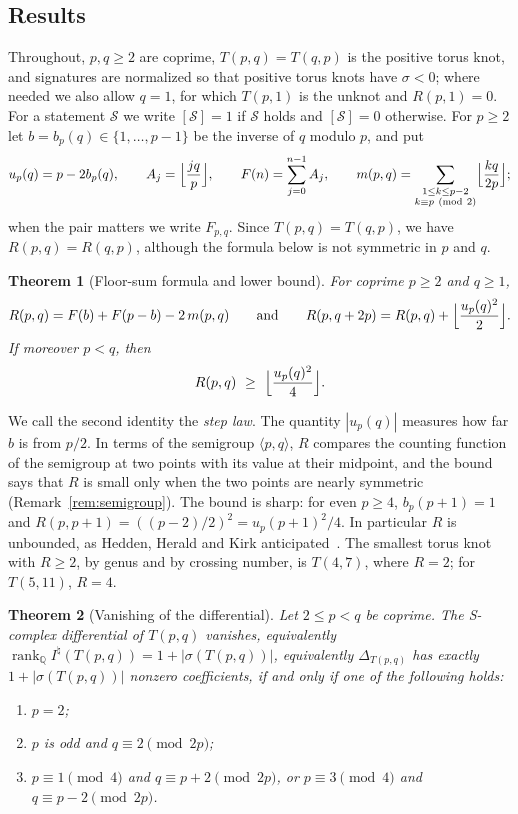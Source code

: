 \documentclass[11pt,reqno]{amsart}
\theoremstyle{plain}
\newtheorem{theorem}{Theorem}[section]
\theoremstyle{definition}
\newcommand{\Q}{\mathbb{Q}}
\newcommand{\Inat}{I^{\natural}}
\begin{document}
\subsection{Results}
Throughout, $p,q\ge2$ are coprime, $T(p,q)=T(q,p)$ is the positive torus knot, and signatures are
normalized so that positive torus knots have $\sigma<0$; where needed we also allow $q=1$, for which
$T(p,1)$ is the unknot and $R(p,1)=0$. For a statement $\mathcal S$ we write $[\mathcal S]=1$ if $\mathcal S$ holds and $[\mathcal S]=0$
otherwise. For $p\ge2$ let $b=b_p(q)\in\{1,\dots,p-1\}$ be the inverse of $q$ modulo $p$, and put
\[
u_p(q)=p-2b_p(q),\qquad A_j=\Bigl\lfloor\frac{jq}{p}\Bigr\rfloor,\qquad F(n)=\sum_{j=0}^{n-1}A_j,
\qquad m(p,q)=\sum_{\substack{1\le k\le p-2\\ k\equiv p\ (\mathrm{mod}\ 2)}}\Bigl\lfloor\frac{kq}{2p}\Bigr\rfloor ;
\]
when the pair matters we write $F_{p,q}$. Since $T(p,q)=T(q,p)$, we have $R(p,q)=R(q,p)$, although the formula below is not symmetric in $p$
and $q$.

\begin{theorem}[Floor-sum formula and lower bound]\label{thm:main}
For coprime $p\ge2$ and $q\ge1$,
\[
R(p,q)=F(b)+F(p-b)-2\,m(p,q)\qquad\text{and}\qquad
R(p,q+2p)=R(p,q)+\Bigl\lfloor\frac{u_p(q)^2}{2}\Bigr\rfloor.
\]
If moreover $p<q$, then
\[
R(p,q)\ \ge\ \Bigl\lfloor\frac{u_p(q)^2}{4}\Bigr\rfloor.
\]
\end{theorem}

We call the second identity the \emph{step law}. The quantity $|u_p(q)|$ measures how far $b$ is from
$p/2$. In terms of the semigroup $\langle p,q\rangle$, $R$ compares the counting function of the
semigroup at two points with its value at their midpoint, and the bound says that $R$ is small only
when the two points are nearly symmetric (Remark~\ref{rem:semigroup}). The bound is sharp: for even $p\ge4$, $b_p(p+1)=1$
and $R(p,p+1)=((p-2)/2)^2=u_p(p+1)^2/4$. In particular $R$ is unbounded, as Hedden, Herald and Kirk
anticipated~\cite[\S12.6]{HHK1}. The smallest torus knot with $R\ge2$, by genus and by crossing number,
is $T(4,7)$, where $R=2$; for $T(5,11)$, $R=4$.

\begin{theorem}[Vanishing of the differential]\label{thm:perfect}
Let $2\le p<q$ be coprime. The S-complex differential of $T(p,q)$ vanishes, equivalently
$\operatorname{rank}_\Q\Inat(T(p,q))=1+|\sigma(T(p,q))|$, equivalently $\Delta_{T(p,q)}$ has exactly
$1+|\sigma(T(p,q))|$ nonzero coefficients, if and only if one of the following holds:
\begin{enumerate}
\item $p=2$;
\item $p$ is odd and $q\equiv2\pmod{2p}$;
\item $p\equiv1\pmod4$ and $q\equiv p+2\pmod{2p}$, or $p\equiv3\pmod4$ and $q\equiv p-2\pmod{2p}$.
\end{enumerate}
\end{theorem}
\end{document}
